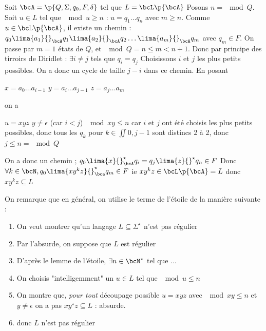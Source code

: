     \begin{nproof}
        Soit $\bcA = \p{Q, \Sigma, q_0, F, \delta}$ tel que $L = \bcL\p{\bcA}$
        Posons $n = \mod{Q}$.
        Soit $u \in L$ tel que $\mod{u} \geq n$ : $u = q_1 \dots q_n$ avec $m \geq n$.
        Comme $u \in \bcL\p{\bcA}$, il existe un chemin :
        $q_0 \lima{a_1}{}_\bcA q_1 \lima{a_2}{}_\bcA q_2 \dots \lima{a_m}{}_\bcA q_m$ avec $q_m \in F$.
        On passe par $m=1$ états de $Q$, et $\mod{Q} = n \leq m < n + 1$.
        Donc par principe des tirroirs de Diridlet :
        $\exists i \neq j$ tels que $q_i = q_j$
        Choisissons $i$ et $j$ les plus petits possibles. On a donc un cycle de taille $j-i$ dans ce chemin. En posant
        \begin{enumerate}
            \itt $x = a_0 \dots a_{i-1}$
            \itt $y = a_i \dots a_{j-1}$
            \itt $z = a_j \dots a_m$
        \end{enumerate}
        on a
        \begin{enumerate}
            \itt $u = x y z$
            \itt $y \neq \epsilon$ (car $i<j$)
            \itt $\mod{xy} \leq n$ car $i$ et $j$ ont été choisis les plus petits possibles, donc tous les $q_k$ pour $k \in \iint{0, j - 1}$ sont distincs 2 à 2, donc $j \leq n = \mod{Q}$
        \end{enumerate}
        On a donc un chemin ;
        $q_0  \lima{x}{}_\bcA^\star q_i = q_j \lima{z}{}^\star q_n \in F$
        Donc $\forall k \in \bcN, q_0 \lima{x y^k z}{}_\bca^\star q_m \in F$
        ie $xy^kz \in \bcL\p{\bcA} = L$
        donc $xy^kz \subseteq L$
    \end{nproof}
    On remarque que en général, on utilise le terme de l'étoile de la manière suivante :
    \begin{enumerate}
        \item On veut montrer qu'un langage $L \subseteq \Sigma^\star$ n'est pas régulier
        \item Par l'absurde, on suppose que $L$ est régulier
        \item D'après le lemme de l'étoile, $\exists n \in \bcN^\star$ tel que ...
        \item On choisis "intelligemment" un $u \in L$ tel que $\mod{u} \leq n$
        \item On montre que, \emph{pour tout} découpage possible $u = x y z$ avec $\mod{xy} \leq n$ et $y \neq \epsilon$ on a pas $x y^\star z \subseteq L$ : absurde.
        \item donc $L$ n'est pas régulier
    \end{enumerate}
    
